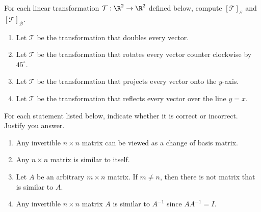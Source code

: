 \begin{exercises}
\begin{problist}
	    \prob For each linear transformation $\mathcal T:\R^2\to\R^2$ defined below, compute $[\mathcal T]_{\mathcal E}$ and $[\mathcal T]_{\mathcal B}$.
	        \begin{enumerate}
	            \item   Let $\mathcal T$ be the transformation that doubles every vector.
			    \item   Let $\mathcal T$ be the transformation that rotates every vector counter clockwise by $45^\circ$.
			    \item   Let $\mathcal T$ be the transformation that projects every vector onto the $y$-axis.
			    \item   Let $\mathcal T$ be the transformation that reflects every vector over the line $y=x$.
	        \end{enumerate}
        
        \prob For each statement listed below, indicate whether it is correct or incorrect. Justify you answer.
        \begin{enumerate}
            \item   Any invertible $n \times n$ matrix can be viewed as a change of basis matrix.
            \item   Any $n \times n$ matrix is similar to itself.
            \item   Let $A$ be an arbitrary $m \times n$ matrix. If $m \neq n$, then there is not matrix that is similar to $A$.
            \item   Any invertible $n \times n$ matrix $A$ is similar to $A^{-1}$ since $AA^{-1}=I$.
        \end{enumerate}
	\end{problist}
\end{exercises}

